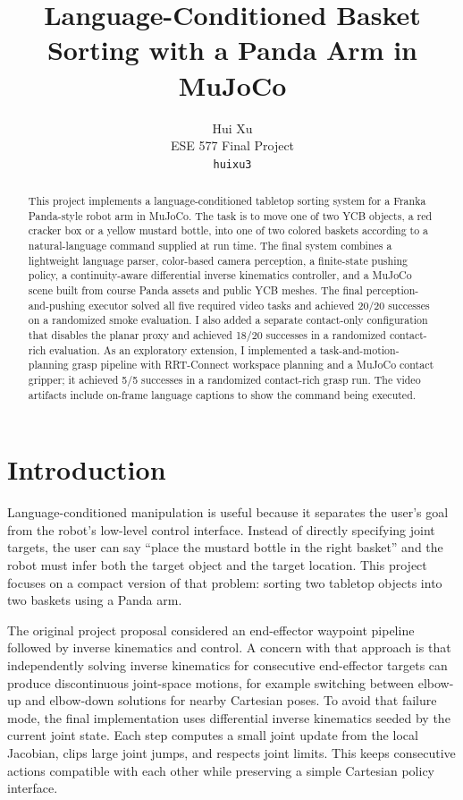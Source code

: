 \documentclass{article}
\title{Language-Conditioned Basket Sorting with a Panda Arm in MuJoCo}
\author{%
  Hui Xu\\
  ESE 577 Final Project\\
  \texttt{huixu3}\\
}
\begin{document}
\maketitle

\begin{abstract}
This project implements a language-conditioned tabletop sorting system for a Franka Panda-style robot arm in MuJoCo. The task is to move one of two YCB objects, a red cracker box or a yellow mustard bottle, into one of two colored baskets according to a natural-language command supplied at run time. The final system combines a lightweight language parser, color-based camera perception, a finite-state pushing policy, a continuity-aware differential inverse kinematics controller, and a MuJoCo scene built from course Panda assets and public YCB meshes. The final perception-and-pushing executor solved all five required video tasks and achieved 20/20 successes on a randomized smoke evaluation. I also added a separate contact-only configuration that disables the planar proxy and achieved 18/20 successes in a randomized contact-rich evaluation. As an exploratory extension, I implemented a task-and-motion-planning grasp pipeline with RRT-Connect workspace planning and a MuJoCo contact gripper; it achieved 5/5 successes in a randomized contact-rich grasp run. The video artifacts include on-frame language captions to show the command being executed.
\end{abstract}

\section{Introduction}

Language-conditioned manipulation is useful because it separates the user's goal from the robot's low-level control interface. Instead of directly specifying joint targets, the user can say ``place the mustard bottle in the right basket'' and the robot must infer both the target object and the target location. This project focuses on a compact version of that problem: sorting two tabletop objects into two baskets using a Panda arm.

The original project proposal considered an end-effector waypoint pipeline followed by inverse kinematics and control. A concern with that approach is that independently solving inverse kinematics for consecutive end-effector targets can produce discontinuous joint-space motions, for example switching between elbow-up and elbow-down solutions for nearby Cartesian poses. To avoid that failure mode, the final implementation uses differential inverse kinematics seeded by the current joint state. Each step computes a small joint update from the local Jacobian, clips large joint jumps, and respects joint limits. This keeps consecutive actions compatible with each other while preserving a simple Cartesian policy interface.
\end{document}
